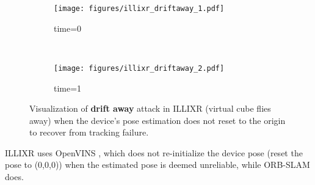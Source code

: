 \begin{figure}[h]
    \centering
        \begin{subfigure}[b]{0.23\textwidth}
            \centering
            \texttt{[image: figures/illixr\_driftaway\_1.pdf]}
            \caption{time=0}
            \label{subfig:illixr_driftaway_1}
        \end{subfigure}~
        \begin{subfigure}[b]{0.23\textwidth}
            \centering
            \texttt{[image: figures/illixr\_driftaway\_2.pdf]}
            \caption{time=1}
            \label{subfig:illixr_driftaway_2}
        \end{subfigure}
    \caption{Visualization of \textbf{drift away} attack in ILLIXR (virtual cube flies away) when the device's pose estimation does not reset to the origin to recover from tracking failure.}
    \label{fig:illixr_driftaway}
\end{figure}

ILLIXR uses OpenVINS \cite{geneva2020openvins}, which does not re-initialize the device pose (\ie reset the pose to (0,0,0)) when the estimated pose is deemed unreliable, while ORB-SLAM does.



